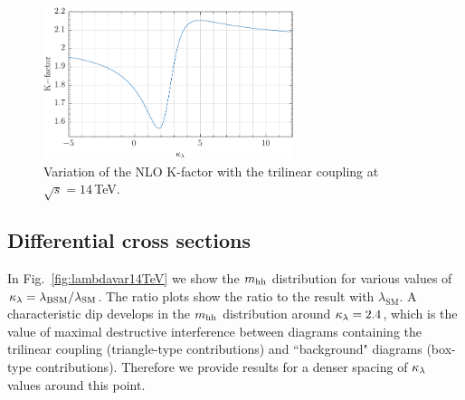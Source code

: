 \begin{figure}[htb]
  \centering
    \includegraphics[width=0.65\textwidth]{plots/Kfactor.pdf}
\caption{Variation of the NLO K-factor with the trilinear coupling at $\sqrt{s}=14$\,TeV.}
\label{fig:Kfacvariation}
\end{figure}


\subsection{Differential cross sections}

In Fig.~\ref{fig:lambdavar14TeV} we show the $m_{\mathrm{hh}}$ distribution for various values of $\kappa_{\lambda}=\lambda_{\mathrm{BSM}}/\lambda_{\mathrm{SM}}$. 
The ratio plots show the ratio to the result with $\lambda_{\mathrm{SM}}$. 
A characteristic dip develops in the $m_{\mathrm{hh}}$ distribution around $\kappa_{\lambda}=2.4$, which is the value of maximal destructive interference between diagrams containing the trilinear coupling (triangle-type contributions) and ``background" diagrams (box-type contributions).
Therefore we provide results for a denser spacing of $\kappa_{\lambda}$ values around this point.

